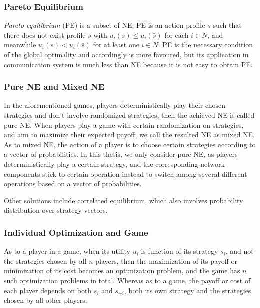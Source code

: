 


\subsubsection*{Pareto Equilibrium}
\textit{Pareto equilibrium} (\gls{PE}) is a subset of NE, PE is an action profile $\bar{s}$ such that there does not exist profile $s$ with $u_i(s)\leq u_i(\bar{s})$ for each $i\in N$, and meanwhile $u_i(s)< u_i(\bar{s})$ for at least one $i\in N$.
PE is the necessary condition of the global optimality and accordingly is more favoured, but its application in communication system is much less than NE because it is not easy to obtain PE.


\subsubsection*{Pure NE and Mixed NE}
In the aforementioned games, players deterministically play their chosen strategies and don't involve randomized strategies, then the achieved NE is called pure NE. 
When players play a game with certain randomization on strategies, and aim to maximize their expected payoff, we call the resulted NE as mixed NE.
As to mixed NE, the action of a player is to choose certain strategies according to a vector of probabilities.
In this thesis, we only consider pure NE, as players deterministically play a certain strategy, and the corresponding network components stick to certain operation instead to switch among several different operations based on a vector of probabilities.

Other solutions include correlated equilibrium, which also involves probability distribution over strategy vectors.





\subsubsection*{Individual Optimization and Game}
As to a player in a game, when its utility $u_i$ is function of its strategy $s_i$, and not the strategies chosen by all $n$ players, then the maximization of its payoff or minimization of its cost becomes an optimization problem, and the game has $n$ such optimization problems in total.
Whereas as to a game, the payoff or cost of each player depends on both $s_i$ and $s_{-i}$, both its own strategy and the strategies chosen by all other players.






